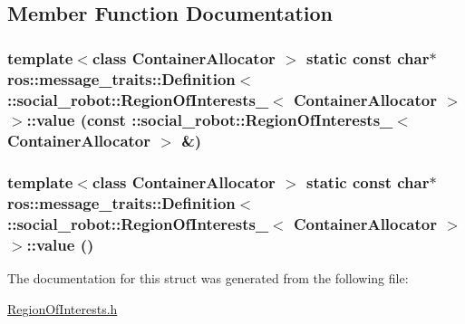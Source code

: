 \subsection{Member Function Documentation}
\hypertarget{structros_1_1message__traits_1_1Definition_3_01_1_1social__robot_1_1RegionOfInterests___3_01ContainerAllocator_01_4_01_4_a9e4b5de6e5de76e5da51c4e6f855a151}{
\subsubsection[{value}]{\setlength{\rightskip}{0pt plus 5cm}template$<$class ContainerAllocator $>$ static const char$\ast$ ros::message\_\-traits::Definition$<$ ::{\bf social\_\-robot::RegionOfInterests\_\-}$<$ ContainerAllocator $>$ $>$::value (const ::{\bf social\_\-robot::RegionOfInterests\_\-}$<$ ContainerAllocator $>$ \&)}}
\label{structros_1_1message__traits_1_1Definition_3_01_1_1social__robot_1_1RegionOfInterests___3_01ContainerAllocator_01_4_01_4_a9e4b5de6e5de76e5da51c4e6f855a151}
\hypertarget{structros_1_1message__traits_1_1Definition_3_01_1_1social__robot_1_1RegionOfInterests___3_01ContainerAllocator_01_4_01_4_a1688b0b335282798011d2e4ae6b193c4}{
\subsubsection[{value}]{\setlength{\rightskip}{0pt plus 5cm}template$<$class ContainerAllocator $>$ static const char$\ast$ ros::message\_\-traits::Definition$<$ ::{\bf social\_\-robot::RegionOfInterests\_\-}$<$ ContainerAllocator $>$ $>$::value ()}}
\label{structros_1_1message__traits_1_1Definition_3_01_1_1social__robot_1_1RegionOfInterests___3_01ContainerAllocator_01_4_01_4_a1688b0b335282798011d2e4ae6b193c4}


The documentation for this struct was generated from the following file:\begin{DoxyCompactItemize}
\item 
\hyperlink{RegionOfInterests_8h}{RegionOfInterests.h}\end{DoxyCompactItemize}
